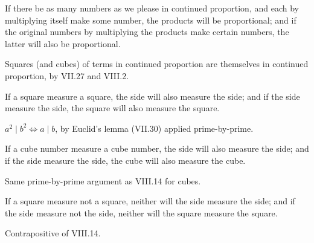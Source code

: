 \documentclass{rrxiv}
\begin{document}
\begin{claim}
\label{prop:VIII.13}
If there be as many numbers as we please in continued proportion, and
each by multiplying itself make some number, the products will be
proportional; and if the original numbers by multiplying the products
make certain numbers, the latter will also be proportional.
\end{claim}
\begin{evidence}
\label{ev:VIII.13}
Squares (and cubes) of terms in continued proportion are themselves
in continued proportion, by VII.27 and VIII.2.
\end{evidence}

\begin{claim}
\label{prop:VIII.14}
If a square measure a square, the side will also measure the side;
and if the side measure the side, the square will also measure the
square.
\end{claim}
\begin{evidence}
\label{ev:VIII.14}
$a^2 \mid b^2 \iff a \mid b$, by Euclid's lemma (VII.30) applied
prime-by-prime.
\end{evidence}

\begin{claim}
\label{prop:VIII.15}
If a cube number measure a cube number, the side will also measure
the side; and if the side measure the side, the cube will also
measure the cube.
\end{claim}
\begin{evidence}
\label{ev:VIII.15}
Same prime-by-prime argument as VIII.14 for cubes.
\end{evidence}

\begin{claim}
\label{prop:VIII.16}
If a square measure not a square, neither will the side measure the
side; and if the side measure not the side, neither will the square
measure the square.
\end{claim}
\begin{evidence}
\label{ev:VIII.16}
Contrapositive of VIII.14.
\end{evidence}
\end{document}
